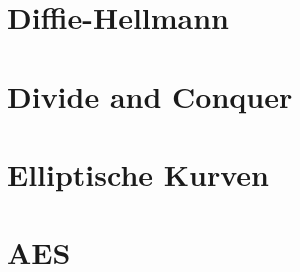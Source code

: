 %
%
%
\section{Diffie-Hellmann}

\section{Divide and Conquer}

\section{Elliptische Kurven}

\section{AES}

